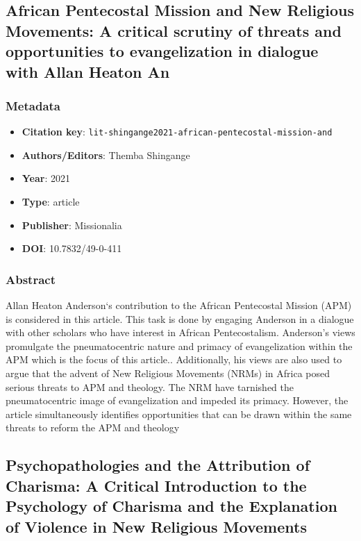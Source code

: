 \subsection{African Pentecostal Mission and New Religious Movements: A critical scrutiny of threats and opportunities to evangelization in dialogue with Allan Heaton An}\label{lit:lit-shingange2021-african-pentecostal-mission-and}
\subsubsection*{Metadata}
\begin{itemize}
  \item \textbf{Citation key}: \texttt{lit-shingange2021-african-pentecostal-mission-and}
  \item \textbf{Authors/Editors}: Themba Shingange
  \item \textbf{Year}: 2021
  \item \textbf{Type}: article
  \item \textbf{Publisher}: Missionalia
  \item \textbf{DOI}: 10.7832/49-0-411
\end{itemize}
\subsubsection*{Abstract}
Allan Heaton Anderson‘s contribution to the African Pentecostal Mission (APM) is considered in this article. This task is done by engaging Anderson in a dialogue with other scholars who have interest in African Pentecostalism. Anderson’s views promulgate the pneumatocentric nature and primacy of evangelization within the APM which is the focus of this article.. Additionally, his views are also used to argue that the advent of New Religious Movements (NRMs) in Africa posed serious threats to APM and theology. The NRM have tarnished the pneumatocentric image of evangelization and impeded its primacy. However, the article simultaneously identifies opportunities that can be drawn within the same threats to reform the APM and theology

\subsection{Psychopathologies and the Attribution of Charisma: A Critical Introduction to the Psychology of Charisma and the Explanation of Violence in New Religious Movements}\label{lit:lit-dawson2006-psychopathologies-and-the-attribution}

